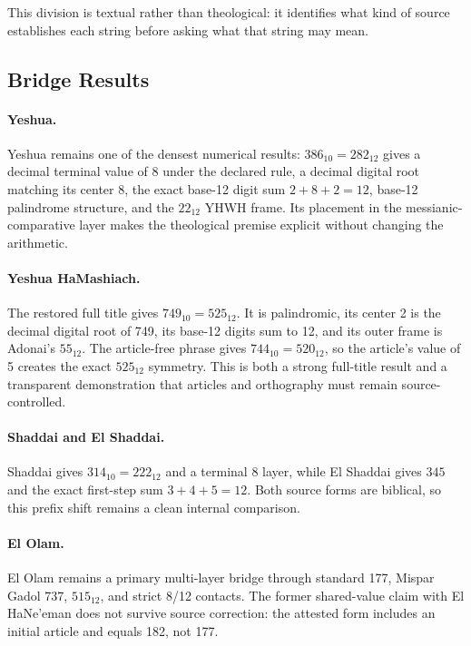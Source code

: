 This division is textual rather than theological: it identifies what kind of source establishes each string before asking what that string may mean.

\subsection{Bridge Results}

\paragraph{Yeshua.}
Yeshua remains one of the densest numerical results: $386_{10}=282_{12}$ gives a decimal terminal value of 8 under the declared rule, a decimal digital root matching its center 8, the exact base-12 digit sum $2+8+2=12$, base-12 palindrome structure, and the $22_{12}$ YHWH frame. Its placement in the messianic-comparative layer makes the theological premise explicit without changing the arithmetic.

\paragraph{Yeshua HaMashiach.}
The restored full title gives $749_{10}=525_{12}$. It is palindromic, its center 2 is the decimal digital root of 749, its base-12 digits sum to 12, and its outer frame is Adonai's $55_{12}$. The article-free phrase gives $744_{10}=520_{12}$, so the article's value of 5 creates the exact $525_{12}$ symmetry. This is both a strong full-title result and a transparent demonstration that articles and orthography must remain source-controlled.

\paragraph{Shaddai and El Shaddai.}
Shaddai gives $314_{10}=222_{12}$ and a terminal 8 layer, while El Shaddai gives $345$ and the exact first-step sum $3+4+5=12$. Both source forms are biblical, so this prefix shift remains a clean internal comparison.

\paragraph{El Olam.}
El Olam remains a primary multi-layer bridge through standard 177, Mispar Gadol 737, $515_{12}$, and strict 8/12 contacts. The former shared-value claim with El HaNe'eman does not survive source correction: the attested form includes an initial article and equals 182, not 177.

